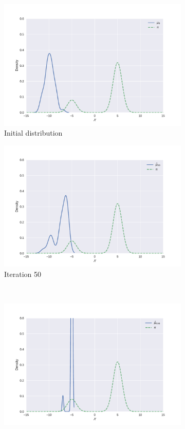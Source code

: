 \documentclass{article}
\begin{document}
\begin{figure}[H]
  \centering
  \begin{subfigure}{0.48\textwidth}
    \centering
    \includegraphics[width=\textwidth]{exp1-0.pdf}
    \caption{Initial distribution}
  \end{subfigure}
  \begin{subfigure}{0.48\textwidth}
    \centering
    \includegraphics[width=\textwidth]{exp1-50.pdf}
    \caption{Iteration 50}
  \end{subfigure}
  \\
  \begin{subfigure}{0.48\textwidth}
    \centering
    \includegraphics[width=\textwidth]{exp1-530.pdf}

\end{subfigure}
\end{figure}
\end{document}
